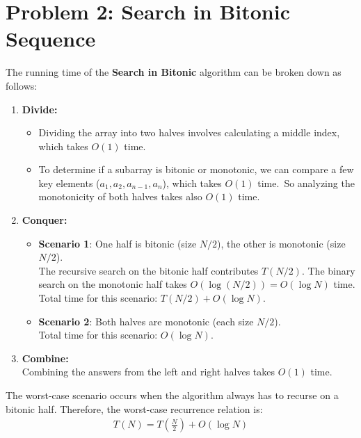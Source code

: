 \documentclass[11pt, a4paper, oneside]{memoir}
\begin{document}

\chapter{Problem 2: Search in Bitonic Sequence}
The running time of the \textbf{Search in Bitonic} algorithm can be broken down as follows:
\begin{enumerate}
    \item \textbf{Divide:}
    \begin{itemize}
        \item Dividing the array into two halves involves calculating a middle index, which takes $O(1)$ time.
        \item To determine if a subarray is bitonic or monotonic, we can compare a few key elements ($a_1, a_2, a_{n-1}, a_n$), which takes $O(1)$ time.\
        So analyzing the monotonicity of both halves takes also $O(1)$ time.
    \end{itemize}
    \item \textbf{Conquer:}
    \begin{itemize}
        \item \textbf{Scenario 1}: One half is bitonic (size $N/2$), the other is monotonic (size $N/2$).\\
        The recursive search on the bitonic half contributes $T(N/2)$.
        The binary search on the monotonic half takes $O(\log(N/2)) = O(\log N)$ time.
        Total time for this scenario: $T(N/2) + O(\log N)$.
        \item \textbf{Scenario 2}: Both halves are monotonic (each size $N/2$).\\
        Total time for this scenario: $O(\log N)$.
    \end{itemize}
    \item \textbf{Combine:} \\
    Combining the answers from the left and right halves takes $O(1)$ time.
\end{enumerate}

The worst-case scenario occurs when the algorithm always has to recurse on a bitonic half. Therefore, the worst-case recurrence relation is:
\begin{align*}
    T(N) = T(\frac{N}{2}) + O(\log N)
\end{align*}
\end{document}
